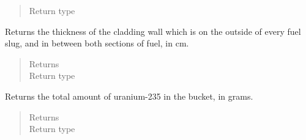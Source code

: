 \documentclass[letterpaper,10pt,openany,oneside,english]{sphinxmanual}
\begin{document}
\begin{fulllineitems}
\begin{fulllineitems}
\begin{quote}
\begin{description}
\item[{Return type}] \leavevmode
{}

\end{description}\end{quote}

\end{fulllineitems}


\begin{fulllineitems}
\label{\detokenize{support_rst/fuel_bucket:fuel_bucket.FuelBucket.get_cladding_wall_thickness}}
Returns the thickness of the cladding wall which is on the outside of
every fuel slug, and in between both sections of fuel, in cm.
\begin{quote}\begin{description}
\item[{Returns}] \leavevmode
{}

\item[{Return type}] \leavevmode
{}

\end{description}\end{quote}

\end{fulllineitems}


\begin{fulllineitems}
\label{\detokenize{support_rst/fuel_bucket:fuel_bucket.FuelBucket.get_fresh_u235_mass}}
Returns the total amount of uranium-235 in the bucket, in grams.
\begin{quote}\begin{description}
\item[{Returns}] \leavevmode
{}

\item[{Return type}] \leavevmode
{}

\end{description}\end{quote}


\end{fulllineitems}
\end{fulllineitems}
\end{document}
